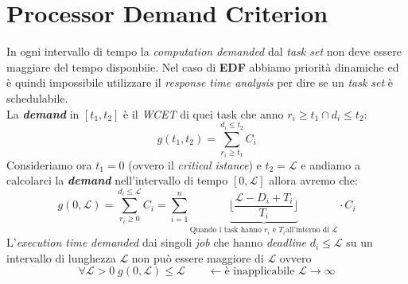 \section{Processor Demand Criterion}
In ogni intervallo di tempo la \textit{computation demanded} dal \textit{task set} non deve essere maggiare del tempo disponbiie. Nel caso di \textbf{EDF} abbiamo priorità dinamiche ed è quindi impossibile utilizzare il \textit{response time analysis} per dire se un \textit{task set} è schedulabile. \\
La \textbf{\textit{demand}} in $[t_1, t_2]$ è il \textit{WCET} di quei task che anno $r_i \geq t_1 \cap d_i \leq t_2$: \[ g(t_1, t_2) = \sum_{r_i \geq t_1}^{d_i \leq t_2} C_i\]
Consideriamo ora $t_1 = 0$ (ovvero il \textit{critical istance}) e $t_2 = \mathcal{L}$ e andiamo a calcolarci la \textbf{\textit{demand}} nell'intervallo di tempo $[0, \mathcal{L}]$ allora avremo che: \[g(0, \mathcal{L}) = \sum_{r_i \geq 0}^{d_i \leq \mathcal{L}} C_i = \sum_{i=1}^n \underbrace{\lfloor \frac{\mathcal{L} - D_i + T_i}{T_i} \rfloor}_{\text{Quando i task hanno }r_i\text{ e }T_i \text{all'interno di }\mathcal{L}} \cdot C_i\]
L'\textit{execution time demanded} dai singoli \textit{job} che hanno \textit{deadline} $d_i \leq \mathcal{L}$ su un intervallo di lunghezza $\mathcal{L}$ non può essere maggiore di $\mathcal{L}$ ovvero \[ \forall \mathcal{L} > 0 \; g(0, \mathcal{L}) \leq \mathcal{L} \qquad \leftarrow \text{è inapplicabile } \mathcal{L} \rightarrow \infty \]
